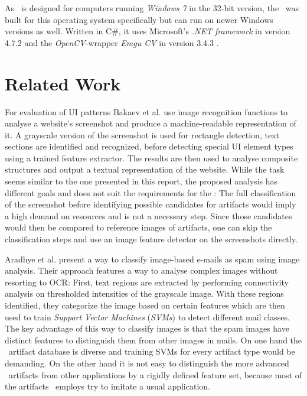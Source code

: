 As \ape~is designed for computers running \emph{Windows 7} in the 32-bit version, the \vd~was built for this operating system specifically but can run on newer Windows versions as well. Written in C\#, it uses Microsoft's \emph{.NET framework} in version 4.7.2 \cite{dotnet4_7_2} and the \emph{OpenCV}-wrapper \emph{Emgu CV} in version 3.4.3 \cite{emgucv}.

\chapter{Related Work}\label{ch:rel-work}

For evaluation of UI patterns Bakaev et al. \cite{ref_web-uis} use image recognition functions to analyse a website's screenshot and produce a machine-readable representation of it. A grayscale version of the screenshot is used for rectangle detection, text sections are identified and recognized, before detecting special UI element types using a trained feature extractor. The results are then used to analyse composite structures and output a textual representation of the website. While the task seems similar to the one presented in this report, the proposed analysis has different goals and does not suit the requirements for the \vd: The full classification of the screenshot before identifying possible candidates for artifacts would imply a high demand on resources and is not a necessary step. Since those candidates would then be compared to reference images of artifacts, one can skip the classification steps and use an image feature detector on the screenshots directly.

Aradhye et al. \cite{ref_spam-mails} present a way to classify image-based e-mails as spam using image analysis. Their approach features a way to analyse complex images without resorting to OCR: First, text regions are extracted by performing connectivity analysis on thresholded intensities of the grayscale image. With these regions identified, they categorize the image based on certain features which are then used to train \emph{Support Vector Machines} (\emph{SVMs}) to detect different mail classes. The key advantage of this way to classify images is that the spam images have distinct features to distinguish them from other images in mails. On one hand the \ape~artifact database is diverse and training SVMs for every artifact type would be demanding. On the other hand it is not easy to distinguish the more advanced \ape~artifacts from other applications by a rigidly defined feature set, because most of the artifacts \ape~employs try to imitate a usual application.


